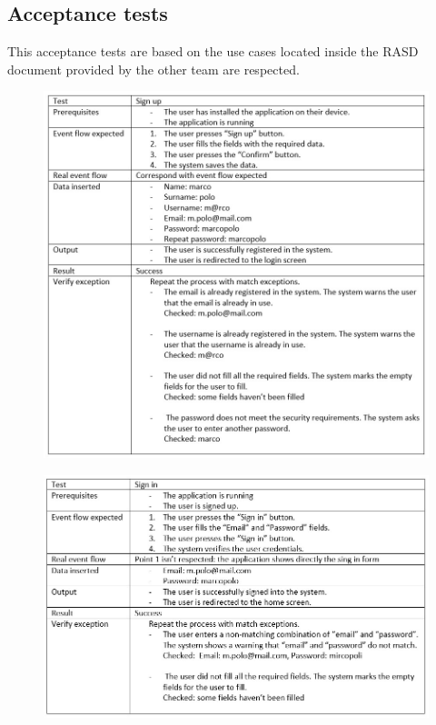 \subsection{Acceptance tests}
This acceptance tests are based on the use cases located inside the RASD document provided by the other team are respected.
\begin{figure}[H]
\centering
\includegraphics[width=\textwidth]{Images/signup.png}
\end{figure}
\newpage
\begin{figure}[H]
\centering
\includegraphics[width=\textwidth]{Images/signin.png}
\end{figure}
